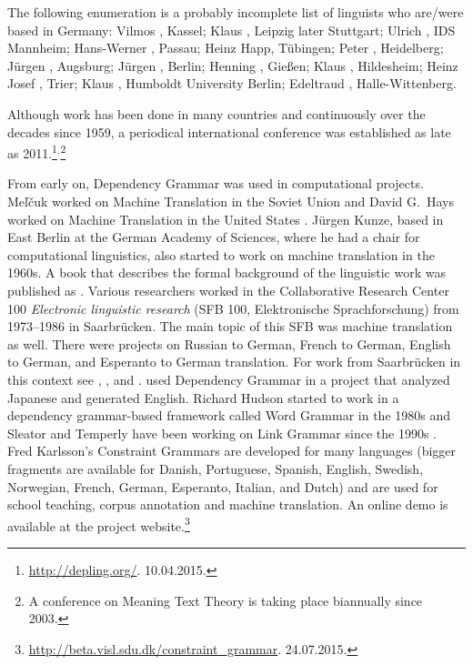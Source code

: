 The following enumeration is a probably incomplete list of linguists who are/were based in Germany: 
Vilmos \citet{Agel2000a-u}, Kassel; 
Klaus \citet{Baumgaertner65a-u,Baumgaertner70a}, Leipzig later Stuttgart;
Ulrich \citet{Engel77,Engel2014a}, IDS Mannheim; 
Hans-Werner \citet{Eroms85a,Eroms87b-u,Eroms2000a}, Passau; 
Heinz Happ, Tübingen;
Peter \citet{Hellwig78a-u,Hellwig2003a}, Heidelberg;
Jürgen \citet{Heringer96a-u}, Augsburg; 
Jürgen \citet{Kunze68a-u,Kunze75a-u}, Berlin;
Henning \citet{Lobin93a-u}, Gießen;
Klaus \citet{Schubert87a-u}, Hildesheim;
Heinz Josef \citet{Weber97a}, Trier;
Klaus \citet{Welke88a-u,Welke2011a-u}, Humboldt University Berlin;
Edeltraud \citet{Werner93a-u}, Halle-Wittenberg.\pagebreak


Although work has been done in many countries and continuously over the decades since 1959, a
periodical international conference was established as late as 2011.\footnote{
  \url{http://depling.org/}. 10.04.2015.
}$^,$\footnote{
  A conference on Meaning Text Theory is taking place biannually since 2003.
}

From early on, Dependency Grammar was used in computational projects. Meľčuk worked on Machine
Translation in the Soviet Union \citep{Melcuk64a-u} and David G.\ Hays worked on Machine Translation
in the United States \citep{HZ60a-u}. Jürgen Kunze, based in East Berlin at the German Academy of
Sciences, where he had a chair for computational linguistics, also started to work on machine
translation in the 1960s. A book that describes the formal background of the linguistic work was
published as .  Various researchers worked in the Collaborative Research Center
100 \emph{Electronic linguistic research} (SFB 100, Elektronische Sprachforschung) from 1973--1986
in Saarbrücken. The main topic of this SFB was machine translation as well. There were projects on
Russian to German, French to German, English to German, and
Esperanto to German translation. For work from Saarbrücken in
this context see , , and .
\citet{MIF85a} used Dependency Grammar in a project that analyzed Japanese and
generated English.
Richard Hudson started to work in a dependency grammar-based framework called Word Grammar\indexwg
in the 1980s \citep{Hudson84a-u,Hudson2007a-u} and Sleator and Temperly have been working on Link
Grammar since the 1990s \citep{ST91a-u,GLS95a-u}.
Fred Karlsson's Constraint Grammars \citeyearpar{Karlsson90a-u} are developed for many languages (bigger fragments are available
for Danish, Portuguese, Spanish, English, Swedish, Norwegian, French, German, Esperanto, Italian, and
Dutch) and are used for school teaching,
corpus annotation and machine translation. An online
demo is available at the project website.\footnote{
  \url{http://beta.visl.sdu.dk/constraint_grammar}. 24.07.2015.
}

